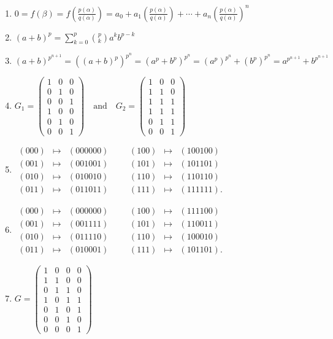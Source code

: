 \documentclass[oneside,10pt,]{article}
\begin{document}
\begin{enumerate}
\item{}\(0 = f(\beta) = f\left( \frac{p(\alpha)}{q(\alpha)} \right) = a_0 + a_1 \left( \frac{p(\alpha)}{q(\alpha)} \right) + \cdots + a_n \left( \frac{p(\alpha)}{q(\alpha)} \right)^n\)%
\item{}\((a + b)^p = \sum_{k = 0}^{p} \binom{p}{k} a^k b^{p - k}\)%
\item{}\((a + b)^{p^{n + 1}} = ((a + b)^p)^{p^{n}} = (a^p + b^p)^{p^{n}} = (a^p)^{p^{n}} + (b^p)^{p^{n}} = a^{p^{n + 1}} + b^{p^{n + 1}}\)%
\item{}\(G_1 = \begin{pmatrix} 1 & 0 & 0 \\ 0 & 1 & 0 \\ 0 & 0 & 1 \\ 1 & 0 & 0 \\ 0 & 1 & 0 \\ 0 & 0 & 1 \end{pmatrix} \quad \text{and} \quad G_2 = \begin{pmatrix} 1 & 0 & 0 \\ 1 & 1 & 0 \\ 1 & 1 & 1 \\ 1 & 1 & 1 \\ 0 & 1 & 1 \\ 0 & 0 & 1 \end{pmatrix}\)%
\item{}\(\begin{array}{rclccrcl} (000) & \mapsto & (000000) & & & (100) & \mapsto & (100100) \\ (001) & \mapsto & (001001) & & & (101) & \mapsto & (101101) \\ (010) & \mapsto & (010010) & & & (110) & \mapsto & (110110) \\ (011) & \mapsto & (011011) & & & (111) & \mapsto & (111111). \end{array}\)%
\item{}\(\begin{array}{rclccrcl} (000) & \mapsto & (000000) & & & (100) & \mapsto & (111100) \\ (001) & \mapsto & (001111) & & & (101) & \mapsto & (110011) \\ (010) & \mapsto & (011110) & & & (110) & \mapsto & (100010) \\ (011) & \mapsto & (010001) & & & (111) & \mapsto & (101101). \end{array}\)%
\item{}\(G = \begin{pmatrix} 1 & 0 & 0 & 0 \\ 1 & 1 & 0 & 0 \\ 0 & 1 & 1 & 0 \\ 1 & 0 & 1 & 1 \\ 0 & 1 & 0 & 1 \\ 0 & 0 & 1 & 0 \\ 0 & 0 & 0 & 1 \end{pmatrix}\)%

\end{enumerate}
\end{document}
